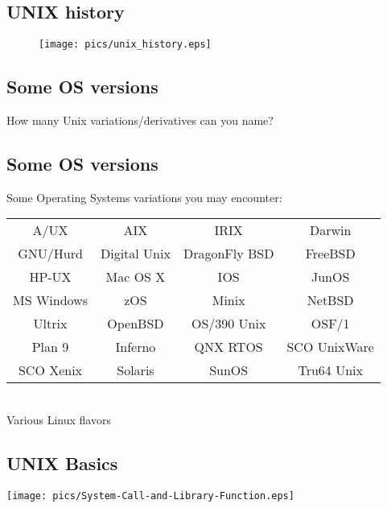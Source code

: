 \documentclass[xga]{xdvislides}
\begin{document}
\subsection{UNIX history}
\vspace*{\fill}
\begin{figure}[hb]
	\begin{center}
		\texttt{[image: pics/unix\_history.eps]} \\
	\end{center}
\end{figure}
\vspace*{\fill}

\subsection{Some OS versions}
How many Unix variations/derivatives can you name?

\subsection{Some OS versions}
Some Operating Systems variations you may encounter:
\\

\vspace{.5in}
\begin{center}
\begin{tabular}{ c c c c }
	A/UX & AIX & IRIX & Darwin \\
	GNU/Hurd & Digital Unix & DragonFly BSD & FreeBSD \\
	HP-UX & Mac OS X & IOS & JunOS \\
	MS Windows & zOS & Minix & NetBSD \\
	Ultrix & OpenBSD & OS/390 Unix & OSF/1 \\
	Plan 9 & Inferno & QNX RTOS & SCO UnixWare \\
	SCO Xenix & Solaris & SunOS & Tru64 Unix \\
\end{tabular}
\\
\vspace{.5in}
	Various Linux flavors
\end{center}

\subsection{UNIX Basics}
\vspace*{\fill}
\begin{center}
	\texttt{[image: pics/System-Call-and-Library-Function.eps]} \\
\end{center}
\vspace*{\fill}
\end{document}
